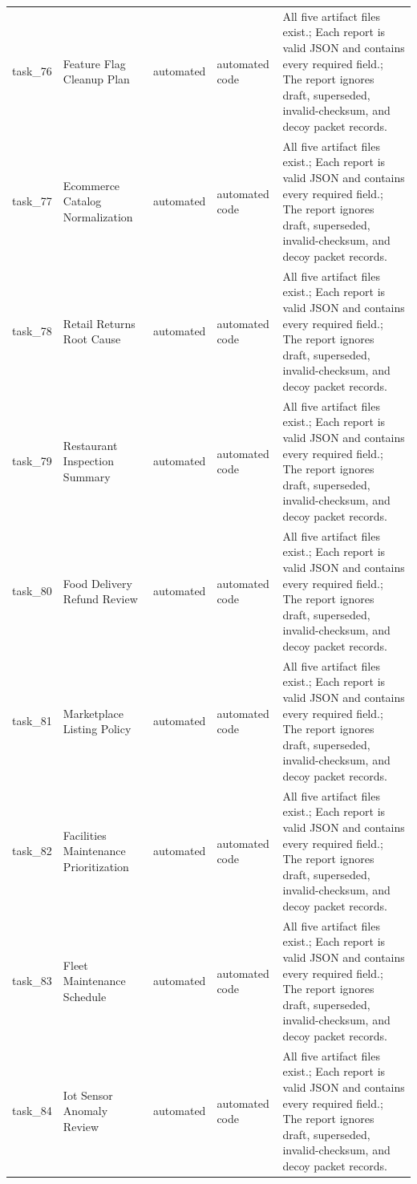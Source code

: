 \documentclass[11pt]{article}
\begin{document}
\begin{longtable}{L{0.07\textwidth}L{0.21\textwidth}L{0.11\textwidth}L{0.16\textwidth}L{0.38\textwidth}}
task\_76 & Feature Flag Cleanup Plan & automated & automated code & All five artifact files exist.; Each report is valid JSON and contains every required field.; The report ignores draft, superseded, invalid-checksum, and decoy packet records. \\
task\_77 & Ecommerce Catalog Normalization & automated & automated code & All five artifact files exist.; Each report is valid JSON and contains every required field.; The report ignores draft, superseded, invalid-checksum, and decoy packet records. \\
task\_78 & Retail Returns Root Cause & automated & automated code & All five artifact files exist.; Each report is valid JSON and contains every required field.; The report ignores draft, superseded, invalid-checksum, and decoy packet records. \\
task\_79 & Restaurant Inspection Summary & automated & automated code & All five artifact files exist.; Each report is valid JSON and contains every required field.; The report ignores draft, superseded, invalid-checksum, and decoy packet records. \\
task\_80 & Food Delivery Refund Review & automated & automated code & All five artifact files exist.; Each report is valid JSON and contains every required field.; The report ignores draft, superseded, invalid-checksum, and decoy packet records. \\
task\_81 & Marketplace Listing Policy & automated & automated code & All five artifact files exist.; Each report is valid JSON and contains every required field.; The report ignores draft, superseded, invalid-checksum, and decoy packet records. \\
task\_82 & Facilities Maintenance Prioritization & automated & automated code & All five artifact files exist.; Each report is valid JSON and contains every required field.; The report ignores draft, superseded, invalid-checksum, and decoy packet records. \\
task\_83 & Fleet Maintenance Schedule & automated & automated code & All five artifact files exist.; Each report is valid JSON and contains every required field.; The report ignores draft, superseded, invalid-checksum, and decoy packet records. \\
task\_84 & Iot Sensor Anomaly Review & automated & automated code & All five artifact files exist.; Each report is valid JSON and contains every required field.; The report ignores draft, superseded, invalid-checksum, and decoy packet records. \\

\end{longtable}
\end{document}
